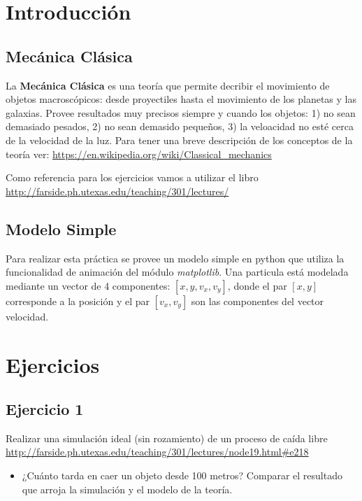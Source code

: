 \documentclass[a4paper]{article}
\begin{document}

\section{Introducción}

\subsection{Mecánica Clásica}

La \textbf{Mecánica Clásica} es una teoría que permite decribir el 
movimiento de objetos macroscópicos: desde proyectiles hasta el 
movimiento de los planetas y las galaxias. Provee resultados muy 
precisos siempre y cuando los objetos: 1) no sean demasiado pesados, 2) 
no sean demasido pequeños, 3) la veloacidad no esté cerca de la 
velocidad de la luz. Para tener una breve descripción de los conceptos 
de la teoría ver: \url{https://en.wikipedia.org/wiki/Classical_mechanics}

\bigskip

Como referencia para los ejercicios vamos a utilizar el libro \url{http://farside.ph.utexas.edu/teaching/301/lectures/}

\subsection{Modelo Simple}

Para realizar esta práctica se provee un modelo simple en python 
que utiliza la funcionalidad de animación del módulo 
\emph{matplotlib}. Una particula está modelada mediante un vector de 4 
componentes: $[x, y, v_x, v_y]$, donde el par $[x,y]$ corresponde a la 
posición y el par $[v_x, v_y]$ son las componentes del vector velocidad.

\section{Ejercicios}

\subsection{Ejercicio 1}

Realizar una simulación ideal (sin rozamiento) de un proceso de caída libre \url{http://farside.ph.utexas.edu/teaching/301/lectures/node19.html#e218}

\begin{itemize}
	\item ¿Cuánto tarda en caer un objeto desde 100 metros? Comparar el 
	resultado que arroja la simulación y el modelo de la teoría.
\end{itemize}
\end{document}
